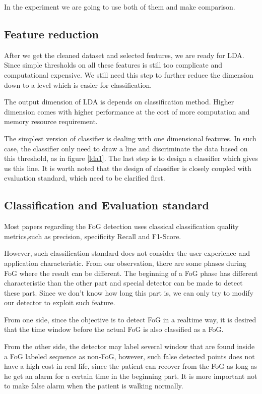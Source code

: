 \documentclass[article]{article}
\begin{document}
In the experiment we are going to use both of them and make comparison.


\subsection{Feature reduction}

After we get the cleaned dataset and selected features, we are ready for LDA. Since simple thresholds on all these features is still too complicate and computational expensive. We still need this step to further reduce the dimension down to a level which is easier for classification.

The output dimension of LDA is depends on classification method. Higher dimension comes with higher performance at the cost of more computation and memory resource requirement.

The simplest version of classifier is dealing with one dimensional features. In such case, the classifier only need to draw a line and discriminate the data based on this threshold, as in figure \ref{lda1}. The last step is to design a classifier which gives us this line. It is worth noted that the design of classifier is closely coupled with evaluation standard, which need to be clarified first.



\subsection{Classification and Evaluation standard}



	Most papers regarding the FoG detection uses classical classification quality metrics,such as precision, specificity Recall and F1-Score.
	
	However, such classification standard does not consider the user experience and application characteristic. From our observation, there are some phases during FoG where the result can be different. The beginning of a FoG phase has different characteristic than the other part and special detector can be made to detect these part. Since we don't know how long this part is, we can only try to modify our detector to exploit such feature.
	
	From one side, since the objective is to detect FoG in a realtime way, it is desired that the time window before the actual FoG is also classified as a FoG.
	
	From the other side, the detector may label several window that are found inside a FoG labeled sequence as non-FoG, however, such false detected points does not have a high cost in real life, since the patient can recover from the FoG as long as he get an alarm for a certain time in the beginning part. It is more important not to make false alarm when the patient is walking normally. 
	
\end{document}
